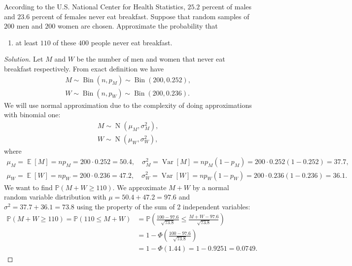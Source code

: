\documentclass{article}[12pt]
\newenvironment{solution}
  {\renewcommand\qedsymbol{$\blacksquare$}\begin{proof}[Solution]}
  {\end{proof}}
\newenvironment{problem}[1]
  {\renewcommand\theinnercustomprblm{#1}\innercustomprblm}
  {\endinnercustomprblm}
\DeclareMathOperator{\Norm}{N}
\DeclareMathOperator{\Var}{Var}
\DeclareMathOperator{\Bin}{Bin}
\DeclareMathOperator{\E}{\mathbb{E}}
\renewcommand{\P}{\mathbb{P}}
\begin{document}
\begin{problem}{6.31(a)}\normalfont
According to the U.S. National Center for Health Statistics, $25.2$ percent of males and $23.6$ percent of females never eat breakfast. 
Suppose that random samples of $200$ men and $200$ women are chosen.
Approximate the probability that
\begin{enumerate}[label=(\alph*)]
    \item at least $110$ of these $400$ people never eat breakfast.
\end{enumerate}
\end{problem}
\begin{solution}
Let $M$ and $W$ be the number of men and women that never eat breakfast respectively.
From exact definition we have
\begin{gather*}
    M\sim\Bin(n, p_{M})\sim\Bin(200, 0.252),
    \\
    W\sim\Bin(n, p_{W})\sim\Bin(200, 0.236).
\end{gather*}
We will use normal approximation due to the complexity of doing approximations with binomial one:
\begin{gather*}
    M\sim\Norm(\mu_{M}, \sigma_{M}^{2}),
    \\
    W\sim\Norm(\mu_{W}, \sigma_{W}^{2}),
\end{gather*}
where
\begin{gather*}
    \mu_{M} = \E[M] = np_{M} = 200\cdot 0.252 = 50.4,\quad\sigma_{M}^{2} = \Var[M] = np_{M}(1 - p_{M}) = 200\cdot 0.252(1 - 0.252) = 37.7,
    \\
    \mu_{W} = \E[W] = np_{W} = 200\cdot 0.236 = 47.2,\quad\sigma_{W}^{2} = \Var[W] = np_{W}(1 - p_{W}) = 200\cdot 0.236(1 - 0.236) = 36.1.
\end{gather*}
We want to find $\P(M + W \geqslant 110)$.
We approximate $M + W$ by a normal random variable distribution with $\mu = 50.4 + 47.2 = 97.6$ and $\sigma^{2} = 37.7 + 36.1 = 73.8$ using the property of the sum of 2 independent variables:
\begin{align*}
    \P(M + W \geqslant 110) = \P(110 \leqslant M + W) &= \P\left(\frac{100 - 97.6}{\sqrt{73.8}} \leqslant \frac{M + W - 97.6}{\sqrt{73.8}}\right)
    \\
    &= 1- \Phi\left(\frac{100 - 97.6}{\sqrt{73.8}}\right)
    \\
    &= 1 - \Phi(1.44) = 1 - 0.9251 = 0.0749.
\end{align*}
\end{solution}
\end{document}

